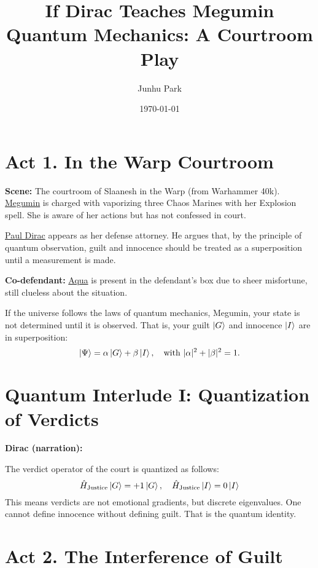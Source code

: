 \documentclass[12pt]{article}
\title{\textbf{If Dirac Teaches Megumin Quantum Mechanics: A Courtroom Play}}
\author{Junhu Park}
\date{\today}
\begin{document}
\maketitle

\section*{Act 1. In the Warp Courtroom}

\textbf{Scene:} The courtroom of Slaanesh in the Warp (from Warhammer 40k\cite{SlaaneshWikipedia}).  
\href{https://en.wikipedia.org/wiki/Megumin}{Megumin}\cite{MeguminWikipedia} is charged with vaporizing three Chaos Marines with her Explosion spell.  
She is aware of her actions but has not confessed in court.

\href{https://en.wikipedia.org/wiki/Paul_Dirac}{Paul Dirac}\cite{DiracWikipedia} appears as her defense attorney.  
He argues that, by the principle of quantum observation, guilt and innocence should be treated as a superposition until a measurement is made.

\textbf{Co-defendant:}  
\href{https://en.wikipedia.org/wiki/Aqua_(KonoSuba)}{Aqua}\cite{AquaWikipedia} is present in the defendant's box due to sheer misfortune, still clueless about the situation.

\begin{tcolorbox}[title=Dirac:]
If the universe follows the laws of quantum mechanics, Megumin, your state is not determined until it is observed. That is, your guilt $\ket{G}$ and innocence $\ket{I}$ are in superposition:
\[
\ket{\Psi} = \alpha \ket{G} + \beta \ket{I}, \quad \text{with } |\alpha|^2 + |\beta|^2 = 1.
\]
\end{tcolorbox}

\section*{Quantum Interlude I: Quantization of Verdicts}

\textbf{Dirac (narration):}

The verdict operator of the court is quantized as follows:
\[
\hat{H}_{\text{Justice}} \ket{G} = +1 \ket{G}, \quad \hat{H}_{\text{Justice}} \ket{I} = 0 \ket{I}
\]
This means verdicts are not emotional gradients, but discrete eigenvalues. One cannot define innocence without defining guilt. That is the quantum identity.

\section*{Act 2. The Interference of Guilt}
\end{document}
